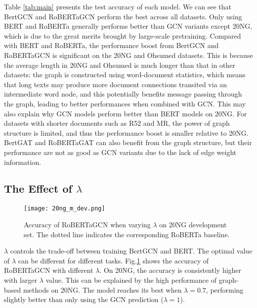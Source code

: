 \documentclass[11pt,a4paper]{article}
\begin{document}
Table \ref{tab:main} presents the test accuracy of each model. We can see that BertGCN and RoBERTaGCN perform the best across all datasets. Only using BERT and RoBERTa generally performs better than  GCN variants except 20NG, which is due to the great merits brought by large-scale pretraining. 
Compared with BERT and RoBERTa, the performance boost from BertGCN and RoBERTaGCN is significant on the 20NG and Ohsumed datasets. This is because the average length in 20NG and Ohsumed is much longer than that in other datasets:
the graph is constructed using word-document statistics, which means that long texts may produce more document connections transited via an intermediate word node, and this potentially benefits message passing through the graph, leading to better performances when combined with GCN.
This may also explain why GCN models perform better than BERT models on 20NG.
For datasets with shorter documents such as R52 and MR, the power of graph structure is limited, and thus the performance boost is smaller relative to 20NG. 
BertGAT and RoBERTaGAT can also benefit from the graph structure, but their performance are not as good as GCN variants due to the lack of edge weight information.


\subsection{The Effect of $\lambda$}
\begin{figure}
    \centering
        \texttt{[image: 20ng\_m\_dev.png]}
    \caption{Accuracy of RoBERTaGCN when varying $\lambda$ on 20NG development set. The dotted line indicates the corresponding RoBERTa baseline.\footnotemark}
    \label{fig:lambda}
\end{figure}

$\lambda$ controls the trade-off between training BertGCN and BERT. The optimal value of $\lambda$ can be different for different tasks. Fig.\ref{fig:lambda} shows the accuracy of RoBERTaGCN with different $\lambda$. On 20NG, the accuracy is consistently higher with larger $\lambda$ value. This can be explained by the high performance of graph-based methods on 20NG. 
The model reaches its best when $\lambda=0.7$, performing slightly better than only using the GCN prediction ($\lambda=1$). 
\end{document}
